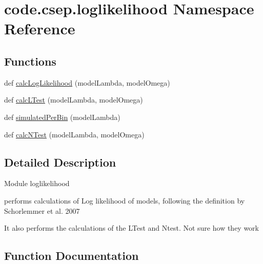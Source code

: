 \hypertarget{namespacecode_1_1csep_1_1loglikelihood}{}\section{code.\+csep.\+loglikelihood Namespace Reference}
\label{namespacecode_1_1csep_1_1loglikelihood}
\subsection*{Functions}
\begin{DoxyCompactItemize}
\item 
def \hyperlink{namespacecode_1_1csep_1_1loglikelihood_a4210aa6f0234a558dc10b7d9efbce3d7}{calc\+Log\+Likelihood} (model\+Lambda, model\+Omega)
\item 
def \hyperlink{namespacecode_1_1csep_1_1loglikelihood_ab524a28d5897863d3f87a5a12c00ab7a}{calc\+L\+Test} (model\+Lambda, model\+Omega)
\item 
def \hyperlink{namespacecode_1_1csep_1_1loglikelihood_ae9b5785a731104c5cee5016f4dece75f}{simulated\+Per\+Bin} (model\+Lambda)
\item 
def \hyperlink{namespacecode_1_1csep_1_1loglikelihood_a377ff5c5859d06ae6dfd50da425ab508}{calc\+N\+Test} (model\+Lambda, model\+Omega)
\end{DoxyCompactItemize}


\subsection{Detailed Description}
\begin{DoxyVerb}Module loglikelihood

performs calculations of Log likelihood of models, following the
definition by Schorlemmer et al. 2007

It also performs the calculations of the LTest and Ntest. Not sure how they work
\end{DoxyVerb}
 

\subsection{Function Documentation}
\mbox{\label{namespacecode_1_1csep_1_1loglikelihood_a4210aa6f0234a558dc10b7d9efbce3d7}} 
